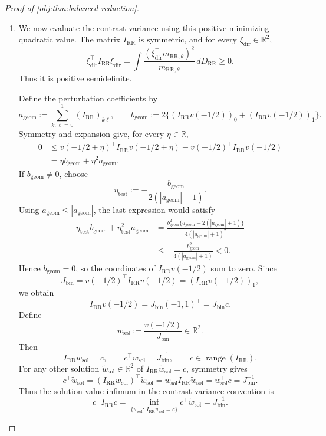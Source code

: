 \begin{proof}[Proof of \cref{obj:thm:balanced-reduction}]
\begin{enumerate}
\item We now evaluate the contrast variance using this positive
minimizing quadratic value. The matrix \(I_{\mathrm{RR}}\) is symmetric,
and for every \(\xi_{\mathrm{dir}}\in\mathbb R^2\),
\[
\xi_{\mathrm{dir}}^\top I_{\mathrm{RR}}\xi_{\mathrm{dir}}
=
\int
\frac{(\xi_{\mathrm{dir}}^\top\dot m_{\mathrm{RR},\theta})^2}
{m_{\mathrm{RR},\theta}}\,dD_{\mathrm{RR}}
\ge0.
\]
Thus it is positive semidefinite.

Define the perturbation coefficients by
\[
a_{\mathrm{geom}}
:=\sum_{k,\ell=0}^1(I_{\mathrm{RR}})_{k\ell},
\qquad
b_{\mathrm{geom}}
:=2\{(I_{\mathrm{RR}}v(-1/2))_0
+(I_{\mathrm{RR}}v(-1/2))_1\}.
\]
Symmetry and expansion give, for every \(\eta\in\mathbb R\),
\[
\begin{aligned}
0
&\le
v(-1/2+\eta)^\top I_{\mathrm{RR}}v(-1/2+\eta)
-v(-1/2)^\top I_{\mathrm{RR}}v(-1/2)\\
&=\eta b_{\mathrm{geom}}+\eta^2a_{\mathrm{geom}}.
\end{aligned}
\]
If \(b_{\mathrm{geom}}\ne0\), choose
\[
\eta_{\mathrm{test}}
:=-\frac{b_{\mathrm{geom}}}{2(|a_{\mathrm{geom}}|+1)}.
\]
Using \(a_{\mathrm{geom}}\le|a_{\mathrm{geom}}|\), the last expression
would satisfy
\[
\begin{aligned}
\eta_{\mathrm{test}}b_{\mathrm{geom}}
+\eta_{\mathrm{test}}^2a_{\mathrm{geom}}
&=
\frac{b_{\mathrm{geom}}^2
\{a_{\mathrm{geom}}-2(|a_{\mathrm{geom}}|+1)\}}
{4(|a_{\mathrm{geom}}|+1)^2}\\
&\le-\frac{b_{\mathrm{geom}}^2}
{4(|a_{\mathrm{geom}}|+1)}<0.
\end{aligned}
\]
Hence \(b_{\mathrm{geom}}=0\), so the coordinates of
\(I_{\mathrm{RR}}v(-1/2)\) sum to zero. Since
\[
J_{\mathrm{bin}}
=v(-1/2)^\top I_{\mathrm{RR}}v(-1/2)
=(I_{\mathrm{RR}}v(-1/2))_1,
\]
we obtain
\[
I_{\mathrm{RR}}v(-1/2)
=J_{\mathrm{bin}}(-1,1)^\top
=J_{\mathrm{bin}}c.
\]
Define
\[
w_{\mathrm{sol}}
:=\frac{v(-1/2)}{J_{\mathrm{bin}}}\in\mathbb R^2.
\]
Then
\[
I_{\mathrm{RR}}w_{\mathrm{sol}}=c,
\qquad
c^\top w_{\mathrm{sol}}=J_{\mathrm{bin}}^{-1},
\qquad
c\in\operatorname{range}(I_{\mathrm{RR}}).
\]
For any other solution
\(\widetilde w_{\mathrm{sol}}\in\mathbb R^2\) of
\(I_{\mathrm{RR}}\widetilde w_{\mathrm{sol}}=c\), symmetry gives
\[
c^\top\widetilde w_{\mathrm{sol}}
=(I_{\mathrm{RR}}w_{\mathrm{sol}})^\top
\widetilde w_{\mathrm{sol}}
=w_{\mathrm{sol}}^\top
I_{\mathrm{RR}}\widetilde w_{\mathrm{sol}}
=w_{\mathrm{sol}}^\top c
=J_{\mathrm{bin}}^{-1}.
\]
Thus the solution-value infimum in the contrast-variance convention is
\[
c^\top I_{\mathrm{RR}}^+c
=
\inf_{\{\widetilde w_{\mathrm{sol}}:\,
I_{\mathrm{RR}}\widetilde w_{\mathrm{sol}}=c\}}
c^\top\widetilde w_{\mathrm{sol}}
=J_{\mathrm{bin}}^{-1}.
\]


\end{enumerate}
\end{proof}
